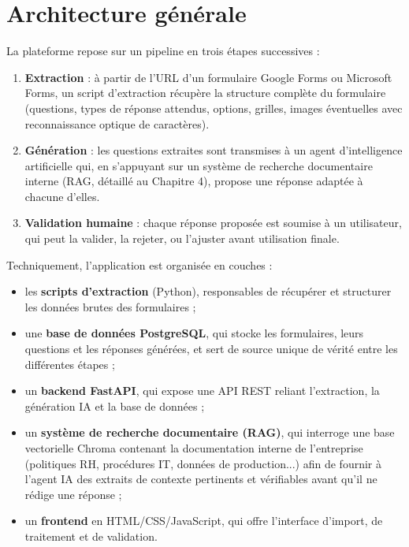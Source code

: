 \documentclass[12pt,a4paper]{report}
\begin{document}
\section{Architecture générale}

La plateforme repose sur un pipeline en trois étapes successives :

\begin{enumerate}
    \item \textbf{Extraction} : à partir de l'URL d'un formulaire Google
    Forms ou Microsoft Forms, un script d'extraction récupère la structure
    complète du formulaire (questions, types de réponse attendus, options,
    grilles, images éventuelles avec reconnaissance optique de caractères).
    \item \textbf{Génération} : les questions extraites sont transmises à
    un agent d'intelligence artificielle qui, en s'appuyant sur un système
    de recherche documentaire interne (RAG, détaillé au Chapitre 4),
    propose une réponse adaptée à chacune d'elles.
    \item \textbf{Validation humaine} : chaque réponse proposée est
    soumise à un utilisateur, qui peut la valider, la rejeter, ou
    l'ajuster avant utilisation finale.
\end{enumerate}

Techniquement, l'application est organisée en couches :

\begin{itemize}
    \item les \textbf{scripts d'extraction} (Python), responsables de
    récupérer et structurer les données brutes des formulaires ;
    \item une \textbf{base de données PostgreSQL}, qui stocke les
    formulaires, leurs questions et les réponses générées, et sert de
    source unique de vérité entre les différentes étapes ;
    \item un \textbf{backend FastAPI}, qui expose une API REST reliant
    l'extraction, la génération IA et la base de données ;
    \item un \textbf{système de recherche documentaire (RAG)}, qui
    interroge une base vectorielle Chroma contenant la documentation
    interne de l'entreprise (politiques RH, procédures IT, données de
    production...) afin de fournir à l'agent IA des extraits de contexte
    pertinents et vérifiables avant qu'il ne rédige une réponse ;
    \item un \textbf{frontend} en HTML/CSS/JavaScript, qui offre
    l'interface d'import, de traitement et de validation.
\end{itemize}
\end{document}
